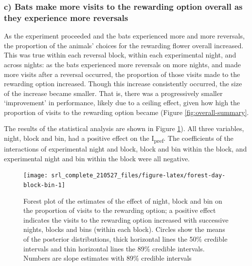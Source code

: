 \documentclass[
]{article}
\begin{document}
\hypertarget{c-bats-make-more-visits-to-the-rewarding-option-overall-as-they-experience-more-reversals}{%
\subsubsection{c) Bats make more visits to the rewarding option overall as they experience more reversals}\label{c-bats-make-more-visits-to-the-rewarding-option-overall-as-they-experience-more-reversals}}

As the experiment proceeded and the bats experienced more and more reversals, the proportion of the animals' choices for the rewarding flower overall increased. This was true within each reversal block, within each experimental night, and across nights: as the bats experienced more reversals on more nights, and made more visits after a reversal occurred, the proportion of those visits made to the rewarding option increased. Though this increase consistently occurred, the size of the increase became smaller. That is, there was a progressively smaller `improvement' in performance, likely due to a ceiling effect, given how high the proportion of visits to the rewarding option became (Figure \ref{fig:overall-summary}.

The results of the statistical analysis are shown in Figure \ref{fig:forest-day-block-bin}). All three variables, night, block and bin, had a positive effect on the I\textsubscript{pref}. The coefficients of the interactions of experimental night and block, block and bin within the block, and experimental night and bin within the block were all negative.



\begin{figure}[H]

{\centering \texttt{[image: srl\_complete\_210527\_files/figure-latex/forest-day-block-bin-1]} 

}

\caption{Forest plot of the estimates of the effect of night, block and bin on the proportion of visits to the rewarding option; a positive effect indicates the visits to the rewarding option increased with successive nights, blocks and bins (within each block). Circles show the means of the posterior distributions, thick horizontal lines the 50\% credible intervals and thin horizontal lines the 89\% credible intervals. Numbers are slope estimates with 89\% credible intervals}\label{fig:forest-day-block-bin}
\end{figure}
\end{document}
